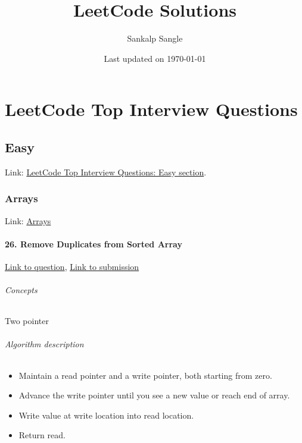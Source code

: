 \documentclass[11pt]{book}
\title{\bf LeetCode Solutions}    %
\author{Sankalp Sangle}              %
\date{Last updated on \today}                           %
\begin{document}
\frontmatter                            %
\maketitle                              %
\tableofcontents                        %
\mainmatter                             %

\part{LeetCode Top Interview Questions}                   %

\chapter{Easy}                %
Link: \href{https://leetcode.com/explore/interview/card/top-interview-questions-easy/}{LeetCode Top Interview Questions: Easy section}. 

\section{Arrays}                  %
Link: \href{https://leetcode.com/explore/interview/card/top-interview-questions-easy/92/array/}{Arrays}

\subsection{26. Remove Duplicates from Sorted Array}
\href{https://leetcode.com/problems/remove-duplicates-from-sorted-array/}{Link to question},
\href{https://leetcode.com/submissions/detail/332869256/}{Link to submission}
\paragraph{Concepts}
Two pointer
\paragraph{Algorithm description}
\begin{itemize}
    \item Maintain a read pointer and a write pointer, both starting from zero.
    \item Advance the write pointer until you see a new value or reach end of array.
    \item Write value at write location into read location.
    \item Return read.
\end{itemize}
\end{document}
